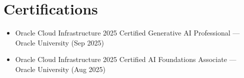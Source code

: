 \documentclass[letterpaper,10pt]{article}
\newcommand{\resumeItem}[1]{\item {\small #1}}
\newcommand{\resumeItemListStart}{%
  \begin{itemize}[leftmargin=0.18in,label=\textbullet,
                  itemsep=2pt,topsep=3pt,parsep=0pt,partopsep=0pt]
}
\newcommand{\resumeItemListEnd}{\end{itemize}}
\begin{document}
\section{Certifications}
\resumeItemListStart
  \resumeItem{Oracle Cloud Infrastructure 2025 Certified Generative AI Professional --- Oracle University (Sep 2025)}
  \resumeItem{Oracle Cloud Infrastructure 2025 Certified AI Foundations Associate --- Oracle University (Aug 2025)}
\resumeItemListEnd
\end{document}
